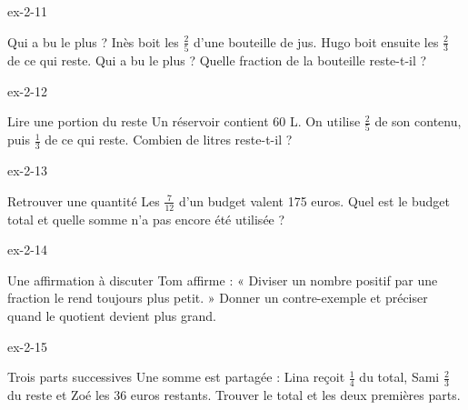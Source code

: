 \begin{blocLivre}{ex-2-11}\begin{exercice}[3]{Qui a bu le plus ?}
Inès boit les $\frac25$ d’une bouteille de jus. Hugo boit ensuite les $\frac23$ de ce qui reste. Qui a bu le plus ? Quelle fraction de la bouteille reste-t-il ?
\end{exercice}\end{blocLivre}
\begin{blocLivre}{ex-2-12}\begin{exercice}[3]{Lire une portion du reste}
Un réservoir contient 60 L. On utilise $\frac25$ de son contenu, puis $\frac13$ de ce qui reste. Combien de litres reste-t-il ?
\end{exercice}\end{blocLivre}
\begin{blocLivre}{ex-2-13}\begin{exercice}[3]{Retrouver une quantité}
Les $\frac7{12}$ d’un budget valent 175 euros. Quel est le budget total et quelle somme n’a pas encore été utilisée ?
\end{exercice}\end{blocLivre}
\begin{blocLivre}{ex-2-14}\begin{exercice}[3]{Une affirmation à discuter}
Tom affirme : « Diviser un nombre positif par une fraction le rend toujours plus petit. » Donner un contre-exemple et préciser quand le quotient devient plus grand.
\end{exercice}\end{blocLivre}
\begin{blocLivre}{ex-2-15}\begin{exercice}[3]{Trois parts successives}
Une somme est partagée : Lina reçoit $\frac14$ du total, Sami $\frac23$ du reste et Zoé les 36 euros restants. Trouver le total et les deux premières parts.
\end{exercice}\end{blocLivre}

\clearpage
